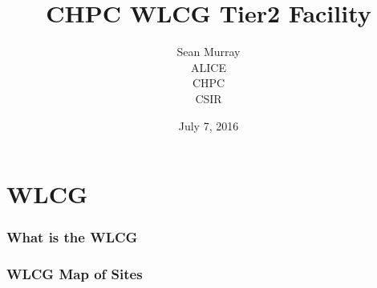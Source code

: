 \documentclass{beamer}
\title{CHPC WLCG Tier2 Facility}
\author{Sean Murray \\
    ALICE \\
    CHPC \\
    CSIR 
}
\date{July 7, 2016}
\begin{document}
\begin{frame}
\titlepage
\end{frame}

\section{WLCG}

\begin{frame}
\frametitle{What is the WLCG}
\end{frame}
\begin{frame}
\frametitle{WLCG Map of Sites}
\end{frame}
\end{document}
